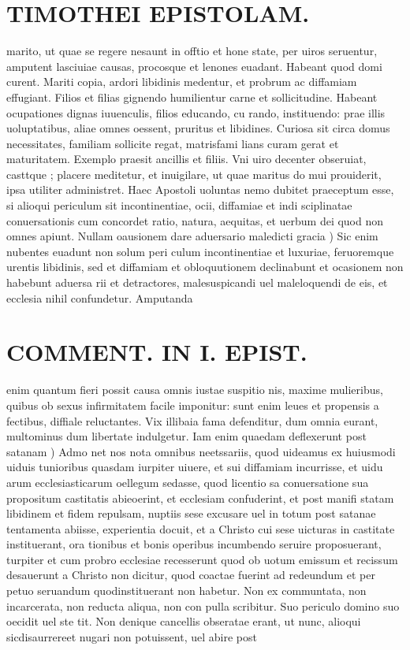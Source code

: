 \documentclass{article}
\begin{document}
\begin{pages}
\section*{TIMOTHEI EPISTOLAM. }
\marginpar{[ p.133 ]}\pstart marito, ut quae se regere nesaunt in offtio et hone state, per uiros seruentur, amputent lasciuiae causas, procosque et lenones euadant. Habeant quod domi curent. Mariti copia, ardori libidinis medentur, et probrum ac diffamiam effugiant. Filios et filias gignendo humilientur carne et sollicitudine. Habeant ocupationes dignas iuuenculis, filios educando, cu rando, instituendo: prae illis uoluptatibus, aliae omnes oessent, pruritus et libidines. Curiosa sit circa domus necessitates, familiam sollicite regat, matrisfami lians curam gerat et maturitatem. Exemplo praesit ancillis et filiis. Vni uiro decenter obseruiat, casttque ; placere meditetur, et inuigilare, ut quae maritus do mui prouiderit, ipsa utiliter administret. Haec Apostoli uoluntas nemo dubitet praeceptum esse, si alioqui periculum sit incontinentiae, ocii, diffamiae et indi sciplinatae conuersationis cum concordet ratio, natura, aequitas, et uerbum dei quod non omnes apiunt.  \pend\pstart Nullam oausionem dare aduersario maledicti gracia ) Sic enim nubentes euadunt non solum peri culum incontinentiae et luxuriae, feruoremque urentis libidinis, sed et diffamiam et obloquutionem declinabunt et ocasionem non habebunt aduersa rii et detractores, malesuspicandi uel maleloquendi de eis, et ecclesia nihil confundetur. Amputanda  \pend
\section*{COMMENT. IN I. EPIST. }
\marginpar{[ p.134 ]}\pstart enim quantum fieri possit causa omnis iustae suspitio nis, maxime mulieribus, quibus ob sexus infirmitatem facile imponitur: sunt enim leues et propensis a fectibus, diffiale reluctantes. Vix illibaia fama defenditur, dum omnia eurant, multominus dum libertate indulgetur.  \pend\pstart Iam enim quaedam deflexerunt post satanam ) Admo net nos nota omnibus neetssariis, quod uideamus ex huiusmodi uiduis tunioribus quasdam iurpiter uiuere, et sui diffamiam incurrisse, et uidu arum ecclesiasticarum oellegum sedasse, quod licentio sa conuersatione sua propositum castitatis abieoerint, et ecclesiam confuderint, et post manifi statam libidinem et fidem repulsam, nuptiis sese excusare uel in totum post satanae tentamenta abiisse, experientia docuit, et a Christo cui sese uicturas in castitate instituerant, ora tionibus et bonis operibus incumbendo seruire proposuerant, turpiter et cum probro ecclesiae recesserunt quod ob uotum emissum et recissum desauerunt a Christo non dicitur, quod coactae fuerint ad redeundum et per petuo seruandum quodinstituerant non habetur. Non ex communtata, non incarcerata, non reducta aliqua, non con pulla scribitur. Suo periculo domino suo oecidit uel ste tit. Non denique cancellis obseratae erant, ut nunc, alioqui sicdisaurrereet nugari non potuissent, uel abire post  \pend

\end{pages}
\end{document}

